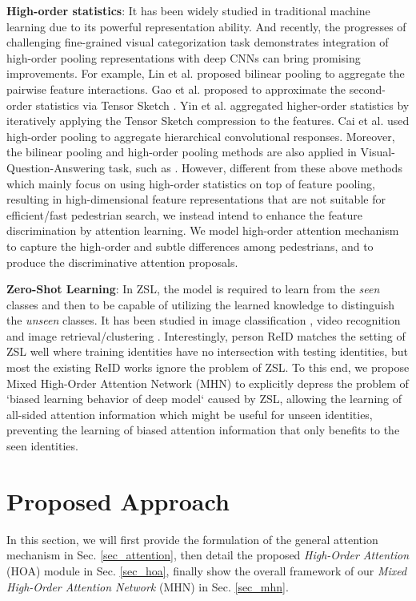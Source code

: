 \documentclass[10pt,twocolumn,letterpaper]{article}
\begin{document}
\textbf{High-order statistics}: It has been widely studied in traditional machine learning due to its powerful representation ability. And recently, the progresses of challenging fine-grained visual categorization task demonstrates integration of high-order pooling representations with deep CNNs can bring promising improvements. For example, Lin et al. \cite{lin2015bilinear} proposed bilinear pooling to aggregate the pairwise feature interactions. Gao et al. \cite{gao2016compact} proposed to approximate the second-order statistics via Tensor Sketch \cite{pham2013fast}. Yin et al. \cite{cui2017kernel} aggregated higher-order statistics by iteratively applying the Tensor Sketch compression to the features. Cai et al. \cite{cai2017higher} used high-order pooling to aggregate hierarchical convolutional responses. Moreover, the bilinear pooling and high-order pooling methods are also applied in Visual-Question-Answering task, such as \cite{fukui2016multimodal,kim2016hadamard,yu2017multi,yu2018beyond}. However, different from these above methods which mainly focus on using high-order statistics on top of feature pooling, resulting in high-dimensional feature representations that are not suitable for efficient/fast pedestrian search, we instead intend to enhance the feature discrimination by attention learning. We model high-order attention mechanism to capture the high-order and subtle differences among pedestrians, and to produce the discriminative attention proposals.

\textbf{Zero-Shot Learning}: In ZSL, the model is required to learn from the \emph{seen} classes and then to be capable of utilizing the learned knowledge to distinguish the \emph{unseen} classes. It has been studied in image classification \cite{li2018discriminative,changpinyo2016synthesized}, video recognition \cite{dalton2013zero} and image retrieval/clustering \cite{chen2019energy}. Interestingly, person ReID matches the setting of ZSL well where training identities have no intersection with testing identities, but most the existing ReID works ignore the problem of ZSL. To this end, we propose Mixed High-Order Attention Network (MHN) to explicitly depress the problem of `biased learning behavior of deep model` \cite{chen2019energy,chen2019hybrid} caused by ZSL, allowing the learning of all-sided attention information which might be useful for unseen identities, preventing the learning of biased attention information that only benefits to the seen identities.
\vspace{-0.5em}
\section{Proposed Approach}
In this section, we will first provide the formulation of the general attention mechanism in Sec. \ref{sec_attention}, then detail the proposed \emph{High-Order Attention} (HOA) module in Sec. \ref{sec_hoa}, finally show the overall framework of our \emph{Mixed High-Order Attention Network} (MHN) in Sec. \ref{sec_mhn}.
\end{document}

